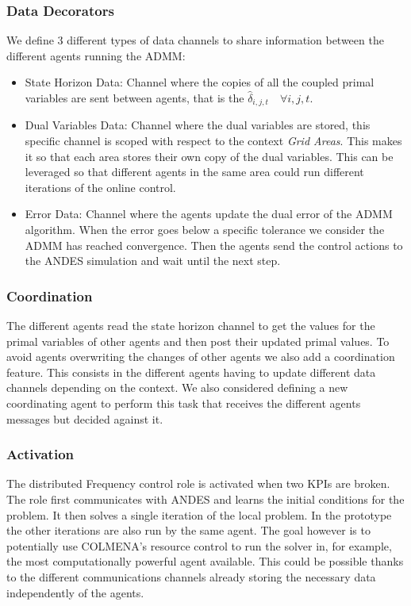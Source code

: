 \documentclass{article}
\begin{document}
\subsubsection*{Data Decorators}

We define 3 different types of data channels to share information between the different agents running the ADMM:

\begin{itemize}
    \item State Horizon  Data: Channel where the copies of all the coupled primal variables are sent between agents, that is the $\hat{\delta}_{i,j,t} \quad \forall i,j,t$.
    \item Dual Variables Data: Channel where the dual variables are stored, this specific channel is scoped with respect to the context \textit{Grid Areas}. This makes it so that each area stores their own copy of the dual variables. This can be leveraged so that different agents in the same area could run different iterations of the online control.
    \item Error Data: Channel where the agents update the dual error of the ADMM algorithm. When the error goes below a specific tolerance we consider the ADMM has reached convergence. Then the agents send the control actions to the ANDES simulation and wait until the next step.
\end{itemize}

\subsubsection*{Coordination}

The different agents read the state horizon channel to get the values for the primal variables of other agents and then post their updated primal values. To avoid agents overwriting the changes of other agents we also add a coordination feature. This consists in the different agents having to update different data channels depending on the context. We also considered defining a new coordinating agent to perform this task that receives the different agents messages but decided against it.

\subsubsection*{Activation}

The distributed Frequency control role is activated when two KPIs are broken. The role first communicates with ANDES and learns the initial conditions for the problem. It then solves a single iteration of the local problem. In the prototype the other iterations are also run by the same agent. The goal however is to potentially use COLMENA's resource control to run the solver in, for example,  the most computationally powerful agent available. This could be possible thanks to the different communications channels already storing the necessary data independently of the agents.
\end{document}
